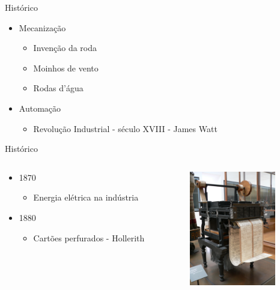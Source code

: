 \documentclass[aspectratio=169,
				xcolor=table]{beamer}
\begin{document}
	\begin{frame}{Histórico}
		\begin{itemize}
			\item Mecanização
			\begin{itemize}
				\item Invenção da roda
				\item Moinhos de vento
				\item Rodas d'água
			\end{itemize}
			\vspace{1em}
			\item Automação
			\begin{itemize}
				\item Revolução Industrial - século XVIII - James Watt
			\end{itemize}
		\end{itemize}
	\end{frame}
	
	\begin{frame}{Histórico}
		\begin{columns}
			\begin{column}{0.5\textwidth}
			
				\begin{itemize}
					\item 1870
					\begin{itemize}
						\item Energia elétrica na indústria
					\end{itemize}
					\vspace{1em}
					\item 1880
					\begin{itemize}
						\item Cartões perfurados - Hollerith
					\end{itemize}
				\end{itemize}
			\end{column}
			\begin{column}{0.5\textwidth}
				\begin{figure}[hbtp]
				\centering
				\includegraphics[height=5cm, keepaspectratio]{../figs/cap04/hollerith.png}
				\end{figure}			
			\end{column}
		\end{columns}
	\end{frame}
\end{document}

